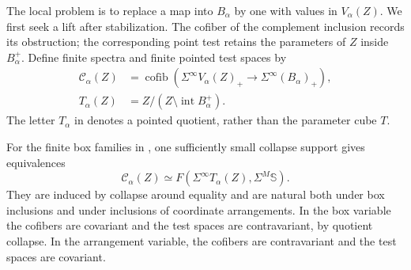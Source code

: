 The local problem is to replace a map into $B_\alpha$ by one with
values in $V_\alpha(Z)$.  We first seek a lift after stabilization.
The cofiber of the complement inclusion records its obstruction;
the corresponding point test retains the parameters of $Z$ inside
$B_\alpha^+$.  Define finite spectra and finite pointed test spaces by
\begin{align}
 \mathcal C_\alpha(Z)
 &=\operatorname{cofib}\left(
 \Sigma^\infty V_\alpha(Z)_+\longrightarrow
 \Sigma^\infty(B_\alpha)_+\right),\label{eq:local-cofiber}\\
 T_\alpha(Z)&=Z/(Z\setminus\operatorname{int}B_\alpha^+).
 \label{eq:local-test-space}
\end{align}
The letter $T_\alpha$ in  denotes a pointed
quotient, rather than the parameter cube $T$.

\begin{lemma}\label{lem:box-duality}
For the finite box families in , one sufficiently
small collapse support gives equivalences
\begin{equation}\label{eq:box-duality}
 \mathcal C_\alpha(Z)\simeq
 F\left(\Sigma^\infty T_\alpha(Z),\Sigma^M\mathbb S\right).
\end{equation}
They are induced by collapse around equality and are natural both under
box inclusions and under inclusions of coordinate arrangements.  In the
box variable the cofibers are covariant and the test spaces are
contravariant, by quotient collapse.  In the arrangement variable,
the cofibers are contravariant and the test spaces are covariant.
\end{lemma}

